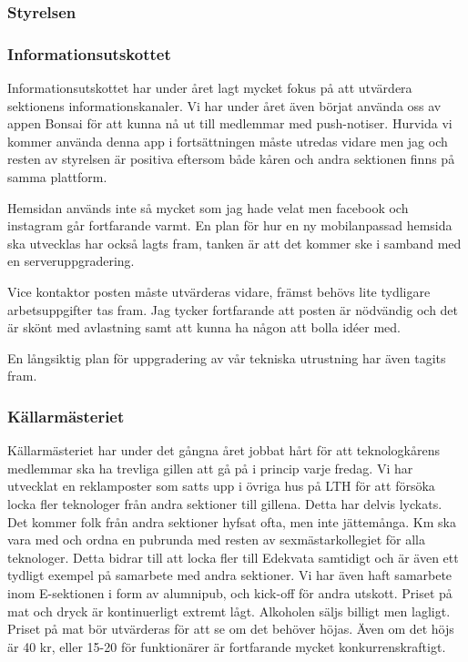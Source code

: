 \documentclass[../_main/handlingar.tex]{subfiles}
\begin{document}

\subsubsection*{Styrelsen}

\subsubsection*{Informationsutskottet}

Informationsutskottet har under året lagt mycket fokus på att utvärdera sektionens informationskanaler. Vi har under året även börjat använda oss av appen Bonsai för att kunna nå ut till medlemmar med push-notiser. 
Hurvida vi kommer använda denna app i fortsättningen måste utredas vidare men jag och resten av styrelsen är positiva eftersom både kåren och andra sektionen finns på samma plattform.

Hemsidan används inte så mycket som jag hade velat men facebook och instagram går fortfarande varmt.
En plan för hur en ny mobilanpassad hemsida ska utvecklas har också lagts fram, tanken är att det kommer ske i samband med en serveruppgradering.

Vice kontaktor posten måste utvärderas vidare, främst behövs lite tydligare arbetsuppgifter tas fram. Jag tycker fortfarande att posten är nödvändig och det är skönt med avlastning samt att kunna ha någon att bolla idéer med.

En långsiktig plan för uppgradering av vår tekniska utrustning har även tagits fram. 

\subsubsection*{Källarmästeriet}
Källarmästeriet har under det gångna året jobbat hårt för att teknologkårens medlemmar ska ha trevliga gillen att gå på i princip varje fredag. Vi har utvecklat en reklamposter som satts upp i övriga hus på LTH för att försöka locka fler teknologer från andra sektioner till gillena. Detta har delvis lyckats. Det kommer folk från andra sektioner hyfsat ofta, men inte jättemånga. 
Km ska vara med och ordna en pubrunda med resten av sexmästarkollegiet för alla teknologer. Detta bidrar till att locka fler till Edekvata samtidigt och är även ett tydligt exempel på samarbete med andra sektioner. Vi har även haft samarbete inom E-sektionen i form av alumnipub, och kick-off för andra utskott.
Priset på mat och dryck är kontinuerligt extremt lågt. Alkoholen säljs billigt men lagligt. Priset på mat bör utvärderas för att se om det behöver höjas. Även om det höjs är 40 kr, eller 15-20 för funktionärer är fortfarande mycket konkurrenskraftigt.
\end{document}
